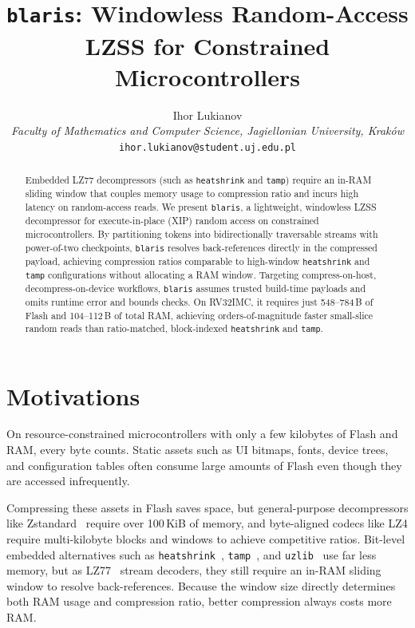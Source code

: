\documentclass[10pt,twocolumn]{article}
\newcommand{\code}[1]{\texttt{#1}}
\begin{document}
\title{\textbf{\texttt{blaris}: Windowless Random-Access LZSS for Constrained Microcontrollers}}

\author{%
  Ihor Lukianov\\
  \small\textit{Faculty of Mathematics and Computer Science, Jagiellonian University, Krak\'{o}w}\\
  \small\texttt{ihor.lukianov@student.uj.edu.pl}%
}

\date{}

\maketitle

\begin{abstract}
\noindent
Embedded LZ77 decompressors (such as \texttt{heatshrink} and \texttt{tamp})
require an in-RAM sliding window that couples memory usage to compression ratio
and incurs high latency on random-access reads. We present \texttt{blaris}, a
lightweight, windowless LZSS decompressor for execute-in-place (XIP)
random access on constrained microcontrollers. By partitioning tokens into
bidirectionally traversable streams with power-of-two checkpoints,
\texttt{blaris} resolves back-references directly in the compressed payload,
achieving compression ratios comparable to high-window \texttt{heatshrink} and
\texttt{tamp} configurations without allocating a RAM window. Targeting
compress-on-host, decompress-on-device workflows, \texttt{blaris} assumes
trusted build-time payloads and omits runtime error and bounds checks. On
RV32IMC, it requires just 548--784\,B of Flash and 104--112\,B of total RAM,
achieving orders-of-magnitude faster small-slice random reads than
ratio-matched, block-indexed \texttt{heatshrink} and \texttt{tamp}.
\end{abstract}

\section{Motivations}
On resource-constrained microcontrollers with only a few kilobytes of Flash and
RAM, every byte counts. Static assets such as UI bitmaps, fonts, device trees,
and configuration tables often consume large amounts of Flash even though they
are accessed infrequently.

Compressing these assets in Flash saves space, but general-purpose decompressors
like Zstandard~\cite{zstd} require over 100\,KiB of memory, and byte-aligned
codecs like LZ4 require multi-kilobyte blocks and windows to achieve competitive
ratios. Bit-level embedded alternatives such as
\code{heatshrink}~\cite{heatshrink}, \code{tamp}~\cite{tamp}, and
\code{uzlib}~\cite{uzlib} use far less memory, but as LZ77~\cite{lz77} stream
decoders, they still require an in-RAM sliding window to resolve
back-references. Because the window size directly determines both RAM usage and
compression ratio, better compression always costs more RAM.
\end{document}
